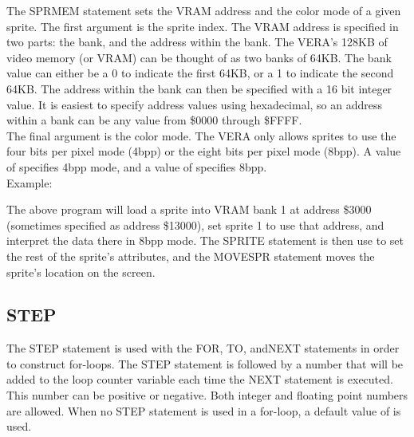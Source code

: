 The {\ttfamily SPRMEM} statement sets the VRAM address and the color mode of a
given sprite.  The first argument is the sprite index.  The VRAM address is
specified in two parts: the bank, and the address within the bank.  The VERA's
128KB of video memory (or VRAM) can be thought of as two banks of 64KB.  The
bank value can either be a 0 to indicate the first 64KB, or a 1 to indicate the
second 64KB.  The address within the bank can then be specified with a 16 bit
integer value.  It is easiest to specify address values using hexadecimal, so
an address within a bank can be any value from \$0000 through \$FFFF.\\

The final argument is the color mode.  The VERA only allows sprites to use the
four bits per pixel mode (4bpp) or the eight bits per pixel mode (8bpp).  A
value of {} specifies 4bpp mode, and a value of {}
specifies 8bpp.\\

Example:\\


The above program will load a sprite into VRAM bank 1 at address \$3000
(sometimes specified as address \$13000), set sprite 1 to use that address, and
interpret the data there in 8bpp mode.  The {\ttfamily SPRITE} statement is
then use to set the rest of the sprite's attributes, and the {\ttfamily
MOVESPR} statement moves the sprite's location on the screen.\\

\subsection{STEP}

The {\ttfamily STEP} statement is used with the {\ttfamily FOR}, {\ttfamily
TO}, and{\ttfamily NEXT} statements in order to construct for-loops.  The
{\ttfamily STEP} statement is followed by a number that will be added to the
loop counter variable each time the {\ttfamily NEXT} statement is executed.
This number can be positive or negative.  Both integer and floating point
numbers are allowed.  When no {\ttfamily STEP} statement is used in a for-loop,
a default value of {} is used.\\

